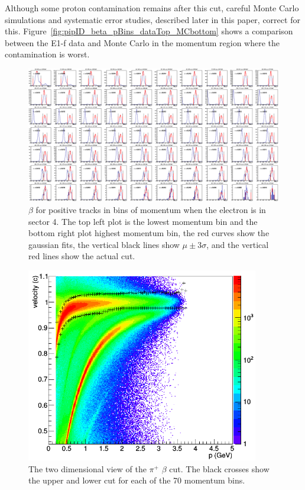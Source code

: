Although some proton contamination remains after this cut, careful Monte Carlo simulations and systematic error studies, described later in this paper, correct for this.
Figure~\ref{fig:pipID_beta_pBins_dataTop_MCbottom} shows a comparison between the E1-f data and Monte Carlo in the momentum region where the contamination is worst.
%
\begin{figure}
\centering
\includegraphics[width=8.5in]{figures/pos_1Dbeta_pBins.png}
\caption{$\beta$ for positive tracks in bins of momentum when the electron is in sector 4. The top left plot is the lowest momentum bin and the bottom right plot highest momentum bin, the red curves show the gaussian fits, the vertical black lines show $\mu \pm 3\sigma$, and the vertical red lines show the actual cut.}
\label{fig:pos_1Dbeta_pBins}
\end{figure}
%
\begin{figure}[htp]
\centering
\includegraphics[width=4in]{figures/pip_vvpCut.png}
\caption{The two dimensional view of the $\pi^+$ $\beta$ cut. The black crosses show the upper and lower cut for each of the 70 momentum bins.}
\label{fig:pip_vvpCut}
\end{figure}
